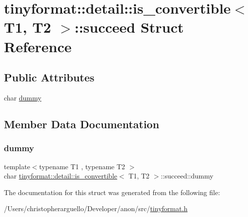 \hypertarget{structtinyformat_1_1detail_1_1is__convertible_1_1succeed}{}\section{tinyformat\+:\+:detail\+:\+:is\+\_\+convertible$<$ T1, T2 $>$\+:\+:succeed Struct Reference}
\label{structtinyformat_1_1detail_1_1is__convertible_1_1succeed}
\subsection*{Public Attributes}
\begin{DoxyCompactItemize}
\item 
char \mbox{\hyperlink{structtinyformat_1_1detail_1_1is__convertible_1_1succeed_a7f25789e5f4b4d4fbc8999f9f096cbf6}{dummy}}
\end{DoxyCompactItemize}


\subsection{Member Data Documentation}
\mbox{\label{structtinyformat_1_1detail_1_1is__convertible_1_1succeed_a7f25789e5f4b4d4fbc8999f9f096cbf6}} 
\subsubsection{\texorpdfstring{dummy}{dummy}}
{\footnotesize\ttfamily template$<$typename T1 , typename T2 $>$ \\
char \mbox{\hyperlink{structtinyformat_1_1detail_1_1is__convertible}{tinyformat\+::detail\+::is\+\_\+convertible}}$<$ T1, T2 $>$\+::succeed\+::dummy}



The documentation for this struct was generated from the following file\+:\begin{DoxyCompactItemize}
\item 
/\+Users/christopherarguello/\+Developer/anon/src/\mbox{\hyperlink{tinyformat_8h}{tinyformat.\+h}}\end{DoxyCompactItemize}
